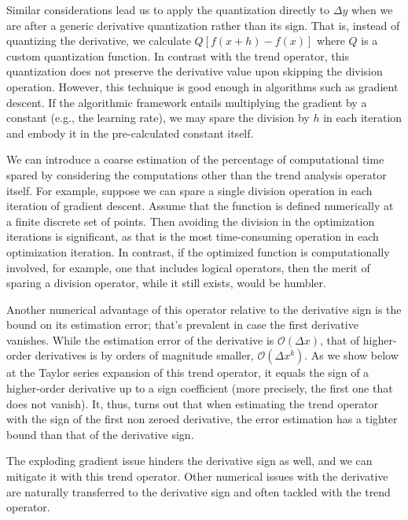 \documentclass[11pt]{book}
\begin{document}
Similar considerations lead us to apply the quantization directly to $\Delta y$ when we are after a generic derivative quantization rather than its sign. That is, instead of quantizing the derivative, we calculate $Q\left[f\left(x+h\right)-f\left(x\right)\right]$ where $Q$ is a custom quantization function. In contrast with the trend operator, this quantization does not preserve the derivative value upon skipping the division operation. However, this technique is good enough in algorithms such as gradient descent. If the algorithmic framework entails multiplying the gradient by a constant (e.g., the learning rate), we may spare the division by $h$ in each iteration and embody it in the pre-calculated constant itself.

We can introduce a coarse estimation of the percentage of computational time spared by considering the computations other than the trend analysis operator itself. For example, suppose we can spare a single division operation in each iteration of gradient descent. Assume that the function is defined numerically at a finite discrete set of points. Then avoiding the division in the optimization iterations is significant, as that is the most time-consuming operation in each optimization iteration. In contrast, if the optimized function is computationally involved, for example, one that includes logical operators, then the merit of sparing a division operator, while it still exists, would be humbler.

Another numerical advantage of this operator relative to the derivative sign is the bound on its estimation error; that's prevalent in case the first derivative vanishes. While the estimation error of the derivative is $\mathcal{O}\left(\Delta x\right)$, that of higher-order derivatives is by orders of magnitude smaller, $\mathcal{O}\left(\Delta x^k\right)$. As we show below at the Taylor series expansion of this trend operator, it equals the sign of a higher-order derivative up to a sign coefficient (more precisely, the first one that does not vanish). It, thus, turns out that when estimating the trend operator with the sign of the first non zeroed derivative, the error estimation has a tighter bound than that of the derivative sign.

The exploding gradient issue hinders the derivative sign as well, and we can mitigate it with this trend operator. Other numerical issues with the derivative are naturally transferred to the derivative sign and often tackled with the trend operator.
\end{document}
